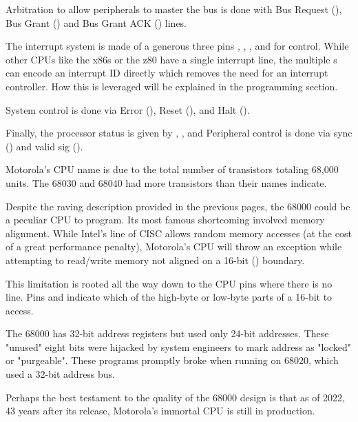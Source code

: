 Arbitration to allow peripherals to master the bus is done with Bus Request (),  Bus Grant () and Bus Grant ACK () lines.

The interrupt system is made of a generous three pins , , , and  for control. While other CPUs like the x86s or the z80 have a single interrupt line, the multiple s can encode an interrupt ID directly which removes the need for an interrupt controller. How this is leveraged will be explained in the programming section.

System control is done via Error (), Reset (), and Halt (). 

Finally, the processor status is given by , ,  and Peripheral control is done via sync () and valid sig ().

\begin{trivia}
Motorola's CPU name is due to the total number of transistors totaling 68,000 units. The 68030 and 68040 had more transistors than their names indicate. 
\end{trivia}

Despite the raving description provided in the previous pages, the 68000 could be a peculiar CPU to program. Its most famous shortcoming involved memory alignment. While Intel's line of CISC allows random memory accesses (at the cost of a great performance penalty), Motorola's CPU will throw an  exception while attempting to read/write memory not aligned on a 16-bit () boundary.

This limitation is rooted all the way down to the CPU pins where there is no  line. Pins  and indicate which of the high-byte or low-byte parts of a 16-bit  to access.


\begin{trivia}
 The 68000 has 32-bit address registers but used only 24-bit addresses. These "unused" eight bits were hijacked by system engineers to mark address as "locked" or "purgeable". These programs promptly broke when running on 68020, which used a 32-bit address bus. 
\end{trivia}

Perhaps the best testament to the quality of the 68000 design is that as of 2022, 43 years after its release, Motorola's immortal CPU is still in production.


